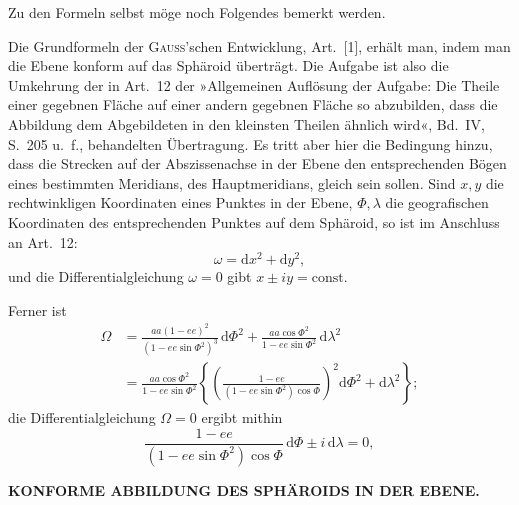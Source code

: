 {Zu den Formeln selbst möge noch Folgendes bemerkt werden.

Die Grundformeln der \textsc{Gauss}'schen Entwicklung, Art.\ [1], erhält man, indem man
die Ebene konform auf das Sphäroid überträgt. Die Aufgabe ist also die Umkehrung der in
Art.\ 12 der »Allgemeinen Auflösung der Aufgabe: Die Theile einer gegebnen Fläche auf einer
andern gegebnen Fläche so abzubilden, dass die Abbildung dem Abgebildeten in den kleinsten
Theilen ähnlich wird«, Bd.\ IV, S.\ 205 u.\ f., behandelten Übertragung. Es tritt aber hier
die Bedingung hinzu, dass die Strecken auf der Abszissenachse in der Ebene den entsprechenden
Bögen eines bestimmten Meridians, des Hauptmeridians, gleich sein sollen.
Sind \(x,y\) die rechtwinkligen Koordinaten eines Punktes in der Ebene, \(\Phi,\lambda\) die
geografischen Koordinaten des entsprechenden Punktes auf dem Sphäroid, so ist im Anschluss
an Art.\ 12:
\[
\omega=\mathrm dx^2+\mathrm dy^2,
\]
\noindent und die Differentialgleichung \(\omega=0\) gibt \(x\pm iy=\mathrm{const.}\)

Ferner ist
\[
\begin{aligned}
\Omega&=\frac{aa(1-ee)^2}{(1-ee\sin\Phi^2)^3}\,\mathrm d\Phi^2
 +\frac{aa\cos\Phi^2}{1-ee\sin\Phi^2}\,\mathrm d\lambda^2\\
&=\frac{aa\cos\Phi^2}{1-ee\sin\Phi^2}
\left\{\left(\frac{1-ee}{(1-ee\sin\Phi^2)\cos\Phi}\right)^2
 \mathrm d\Phi^2+\mathrm d\lambda^2\right\};
\end{aligned}
\]
\noindent die Differentialgleichung \(\Omega=0\) ergibt mithin
\[
\frac{1-ee}{(1-ee\sin\Phi^2)\cos\Phi}\,\mathrm d\Phi\pm i\,\mathrm d\lambda=0,
\]
\par}

\par\clearpage
\noindent\null\hfill{\small\textbf{KONFORME ABBILDUNG DES SPHÄROIDS IN DER EBENE.}}\hfill{}\par\medskip

